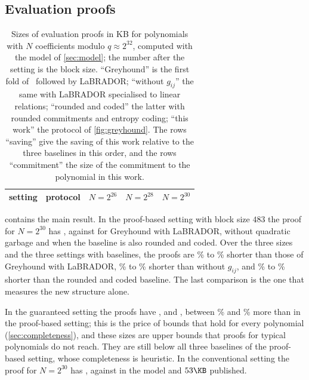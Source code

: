 \subsection{Evaluation proofs}\label{sec:main}

\begin{table}[t]
\centering\small
\setlength{\tabcolsep}{5.5pt}
\begin{tabular}{@{}llrrr@{}}
\toprule
setting & protocol & $N=2^{26}$ & $N=2^{28}$ & $N=2^{30}$\\
\midrule

\bottomrule
\end{tabular}
\caption{Sizes of evaluation proofs in KB for polynomials with $N$ coefficients modulo $q\approx2^{32}$, computed with the model of \cref{sec:model}; the number after the setting is the block size. ``Greyhound'' is the first fold of~\cite{NS24} followed by LaBRADOR; ``without $g_{ij}$'' the same with LaBRADOR specialised to linear relations; ``rounded and coded'' the latter with rounded commitments and entropy coding; ``this work'' the protocol of \cref{fig:greyhound}. The rows ``saving'' give the saving of this work relative to the three baselines in this order, and the rows ``commitment'' the size of the commitment to the polynomial in this work.}
\label{tab:main}
\end{table}

 contains the main result. In the proof-based setting with block size $483$ the proof for $N=2^{30}$ has \nWQc\KB, against \nBQc\KB{} for Greyhound with LaBRADOR, \nLQc\KB{} without quadratic garbage and \nSQc\KB{} when the baseline is also rounded and coded. Over the three sizes and the three settings with baselines, the proofs are \nPctLo\% to \nPctHi\% shorter than those of Greyhound with LaBRADOR, \nPctLinLo\% to \nPctLinHi\% shorter than without $g_{ij}$, and \nPctStrongLo\% to \nPctStrongHi\% shorter than the rounded and coded baseline. The last comparison is the one that measures the new structure alone.

In the guaranteed setting the proofs have \nGQa, \nGQb{} and \nGQc\KB, between \nGPctLo\% and \nGPctHi\% more than in the proof-based setting; this is the price of bounds that hold for every polynomial (\cref{sec:completeness}), and these sizes are upper bounds that proofs for typical polynomials do not reach. They are still below all three baselines of the proof-based setting, whose completeness is heuristic. In the conventional setting the proof for $N=2^{30}$ has \nWCc\KB, against \nBCc\KB{} in the model and $53\KB$ published.

